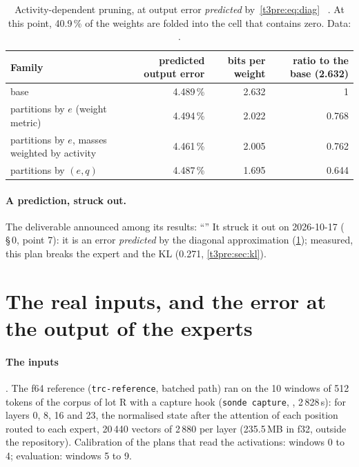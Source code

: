 \begin{table}[tbp]
\centering\footnotesize\setlength{\tabcolsep}{3pt}
\begin{tabularx}{\linewidth}{@{}>{\raggedright\arraybackslash}X r r r@{}}
\toprule
Family & predicted output error & bits per weight & ratio to the base (2.632) \\
\midrule
base & 4.489\,\% & 2.632 & 1 \\
partitions by $e$ (weight metric) & 4.494\,\% & 2.022 & 0.768 \\
partitions by $e$, masses weighted by activity & 4.461\,\% & 2.005 & 0.762 \\
partitions by $(e, q)$ & 4.487\,\% & 1.695 & 0.644 \\
\bottomrule
\end{tabularx}
\caption[Activity-dependent pruning, predicted error]{Activity-dependent pruning, at output error \emph{predicted} by~\eqref{t3pre:eq:diag} \mes~\calc. At this point, 40.9\,\% of the weights are folded into the cell that contains zero. Data: .}
\label{t3pre:tab:activite}
\end{table}

\paragraph{A prediction, struck out.} The deliverable announced among its results: ``'' It struck it out on 2026-10-17 ( §\,0, point 7): it is an error \emph{predicted} by the diagonal approximation (\cref{t3pre:tab:activite}); measured, this plan breaks the expert and the KL (0.271, \cref{t3pre:sec:kl}).

\section{The real inputs, and the error at the output of the experts}\label{t3pre:sec:sortie}

\paragraph{The inputs} \mes. The f64 reference (\texttt{trc-reference}, batched path) ran on the 10 windows of 512 tokens of the corpus of lot R with a capture hook (\texttt{sonde capture}, , 2\,828\,s): for layers 0, 8, 16 and 23, the normalised state after the attention of each position routed to each expert, 20\,440 vectors of 2\,880 per layer (235.5\,MB in f32, outside the repository). Calibration of the plans that read the activations: windows 0 to 4; evaluation: windows 5 to 9.

